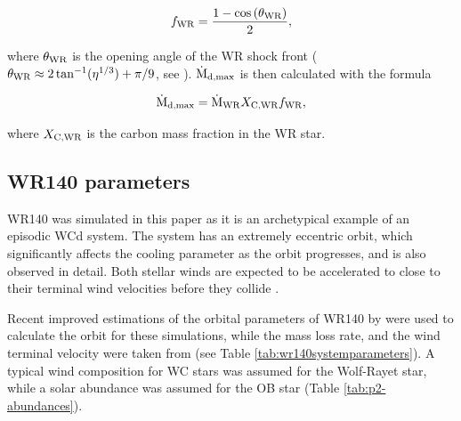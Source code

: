 \begin{equation}
  f_\text{WR} = \frac{1 - \cos\left(\theta_\text{WR}\right)}{2},
\end{equation}

\noindent
where $\theta_\text{WR}$ is the opening angle of the WR shock front ($\theta_\text{WR} \approx 2 \tan^{-1}(\eta^{1/3}) + \pi/9$, see \cite{pittardCollidingStellarWinds2018}).
$\dot{\text{M}}_\text{d,max}$ is then calculated with the formula

\begin{equation}
  \label{eq:p2-maxdustrate}
  \dot{\text{M}}_\text{d,max} = \dot{\text{M}}_\text{WR} X_\text{C,WR} f_\text{WR},
\end{equation}

\noindent
where $X_\text{C,WR}$ is the carbon mass fraction in the WR star.

\subsection{WR140 parameters}

WR140 was simulated in this paper as it is an archetypical example of an episodic WCd system.
The system has an extremely eccentric orbit, which significantly affects the cooling parameter as the orbit progresses, and is also observed in detail.
Both stellar winds are expected to be accelerated to close to their terminal wind velocities before they collide \parencite{lamersIntroductionStellarWinds1999}.

Recent improved estimations of the orbital parameters of WR140 by \textcite{thomasOrbitStellarMasses2021} were used to calculate the orbit for these simulations, while the mass loss rate, and the wind terminal velocity were taken from \textcite{williamsMultifrequencyVariationsWolfrayet1990}
(see Table \ref{tab:wr140systemparameters}).
A typical wind composition for WC stars was assumed for the Wolf-Rayet star, while a solar abundance was assumed for the OB star (Table \ref{tab:p2-abundances}).


